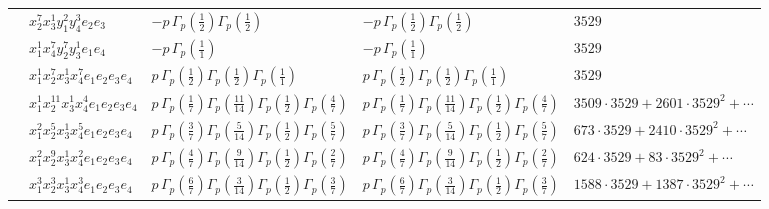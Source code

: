 \documentclass[11pt]{article}
\begin{document}
\begin{table}[ht]
{\begin{tabular}{@{}lllll@{}}
 & $x_{2}^{7} x_{3}^{1} y_{1}^{2} y_{4}^{3} e_{2} e_{3}$ & $- p \, \Gamma_p \left( \frac{1}{2} \right) \Gamma_p \left( \frac{1}{2} \right)$ & $- p \, \Gamma_p \left( \frac{1}{2} \right) \Gamma_p \left( \frac{1}{2} \right)$ & $3529$ \\
 & $x_{1}^{1} x_{4}^{7} y_{2}^{7} y_{3}^{1} e_{1} e_{4}$ & $- p \, \Gamma_p \left( \frac{1}{1} \right)$ & $- p \, \Gamma_p \left( \frac{1}{1} \right)$ & $3529$ \\
 & $x_{1}^{1} x_{2}^{7} x_{3}^{1} x_{4}^{7}  e_{1} e_{2} e_{3} e_{4}$ & $p \, \Gamma_p \left( \frac{1}{2} \right) \Gamma_p \left( \frac{1}{2} \right) \Gamma_p \left( \frac{1}{1} \right)$ & $p \, \Gamma_p \left( \frac{1}{2} \right) \Gamma_p \left( \frac{1}{2} \right) \Gamma_p \left( \frac{1}{1} \right)$ & $3529$ \\
 & $x_{1}^{1} x_{2}^{11} x_{3}^{1} x_{4}^{4}  e_{1} e_{2} e_{3} e_{4}$ & $p \, \Gamma_p \left( \frac{1}{7} \right) \Gamma_p \left( \frac{11}{14} \right) \Gamma_p \left( \frac{1}{2} \right) \Gamma_p \left( \frac{4}{7} \right)$ & $p \, \Gamma_p \left( \frac{1}{7} \right) \Gamma_p \left( \frac{11}{14} \right) \Gamma_p \left( \frac{1}{2} \right) \Gamma_p \left( \frac{4}{7} \right)$ & $3509{\cdot}3529{+}2601{\cdot}3529^{2}{+}\cdots$ \\
 & $x_{1}^{2} x_{2}^{5} x_{3}^{1} x_{4}^{5}  e_{1} e_{2} e_{3} e_{4}$ & $p \, \Gamma_p \left( \frac{3}{7} \right) \Gamma_p \left( \frac{5}{14} \right) \Gamma_p \left( \frac{1}{2} \right) \Gamma_p \left( \frac{5}{7} \right)$ & $p \, \Gamma_p \left( \frac{3}{7} \right) \Gamma_p \left( \frac{5}{14} \right) \Gamma_p \left( \frac{1}{2} \right) \Gamma_p \left( \frac{5}{7} \right)$ & $673{\cdot}3529{+}2410{\cdot}3529^{2}{+}\cdots$ \\
 & $x_{1}^{2} x_{2}^{9} x_{3}^{1} x_{4}^{2}  e_{1} e_{2} e_{3} e_{4}$ & $p \, \Gamma_p \left( \frac{4}{7} \right) \Gamma_p \left( \frac{9}{14} \right) \Gamma_p \left( \frac{1}{2} \right) \Gamma_p \left( \frac{2}{7} \right)$ & $p \, \Gamma_p \left( \frac{4}{7} \right) \Gamma_p \left( \frac{9}{14} \right) \Gamma_p \left( \frac{1}{2} \right) \Gamma_p \left( \frac{2}{7} \right)$ & $624{\cdot}3529{+}83{\cdot}3529^{2}{+}\cdots$ \\
 & $x_{1}^{3} x_{2}^{3} x_{3}^{1} x_{4}^{3}  e_{1} e_{2} e_{3} e_{4}$ & $p \, \Gamma_p \left( \frac{6}{7} \right) \Gamma_p \left( \frac{3}{14} \right) \Gamma_p \left( \frac{1}{2} \right) \Gamma_p \left( \frac{3}{7} \right)$ & $p \, \Gamma_p \left( \frac{6}{7} \right) \Gamma_p \left( \frac{3}{14} \right) \Gamma_p \left( \frac{1}{2} \right) \Gamma_p \left( \frac{3}{7} \right)$ & $1588{\cdot}3529{+}1387{\cdot}3529^{2}{+}\cdots$ \\

\end{tabular}}
\end{table}
\end{document}
